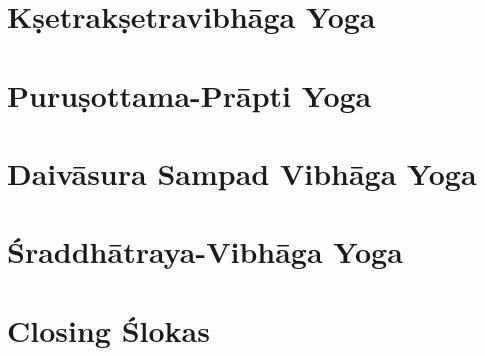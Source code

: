 \documentclass{scrbook}
\begin{document}
\chapter{Kṣetrakṣetravibhāga Yoga}
\begin{multicols}{2}
    
\end{multicols}

\setcounter{chapter}{14}

\chapter{Puruṣottama-Prāpti Yoga}
\begin{multicols}{2}
    
\end{multicols}

\chapter{Daivāsura Sampad Vibhāga Yoga}
\begin{multicols}{2}
    
\end{multicols}

\chapter{Śraddhātraya-Vibhāga Yoga}
\begin{multicols}{2}
    
\end{multicols}

\backmatter
\chapter{Closing Ślokas}

\end{document}
